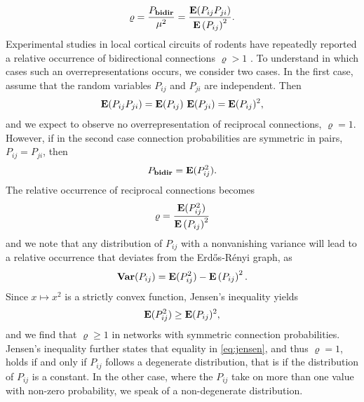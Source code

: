 \begin{align}
\varrho = \frac{P_{\mathbf{bidir}}}{\mu^2} = \frac{\operatorname{\mathbf{E}}(P_{ij}P_{ji})}{{\operatorname{\mathbf{E}}\left(P_{ij}\right)}^2}.
\end{align}
%
Experimental studies in local cortical circuits of rodents have repeatedly reported a relative occurrence of bidirectional connections $\varrho > 1$ \cite{Markram1997, Song2005, Perin2011}. To understand in which cases such an overrepresentations occurs, we consider two cases. In the first case, assume that the random variables $P_{ij}$ and $P_{ji}$ are independent. Then
\begin{align}
\operatorname{\mathbf{E}}(P_{ij} P_{ji}) = \operatorname{\mathbf{E}}(P_{ij})\,\operatorname{\mathbf{E}}(P_{ji}) = \operatorname{\mathbf{E}}(P_{ij})^2,
\end{align}
and we expect to observe no overrepresentation of reciprocal connections, $\varrho = 1$. However, if in the second case connection probabilities are symmetric in pairs, $P_{ij} = P_{ji}$, then 
\begin{align}
P_{\mathbf{bidir}} = \operatorname{\mathbf{E}}(P_{ij}^2).
\end{align}
%
The relative occurrence of reciprocal connections becomes
\begin{align}
\varrho = \frac{\operatorname{\mathbf{E}}(P_{ij}^2)}{{\operatorname{\mathbf{E}}\left(P_{ij}\right)}^2}
\end{align}
and we note that any distribution of $P_{ij}$ with a nonvanishing variance will lead to a relative occurrence that deviates from the Erd\H{o}s-R\'{e}nyi graph, as
\begin{align}
\operatorname{\mathbf{Var}}(P_{ij}) = \operatorname{\mathbf{E}}(P_{ij}^2) - \operatorname{\mathbf{E}}\left(P_{ij}\right)^2.
\end{align}
Since $x \mapsto x^2$ is a strictly convex function, Jensen's inequality \cite{Jensen1906, Cover2006} yields
\begin{align}
\operatorname{\mathbf{E}}(P_{ij}^2) \geq \operatorname{\mathbf{E}}(P_{ij})^2, \label{eq:jensen}
\end{align}
and we find that $\varrho \geq 1$ in networks with symmetric connection probabilities. Jensen's inequality further states that equality in \eqref{eq:jensen}, and thus $\varrho = 1$, holds if and only if $P_{ij}$ follows a degenerate distribution, that is if the distribution of $P_{ij}$ is a constant. In the other case, where the $P_{ij}$ take on more than one value with non-zero probability, we speak of a non-degenerate distribution.

